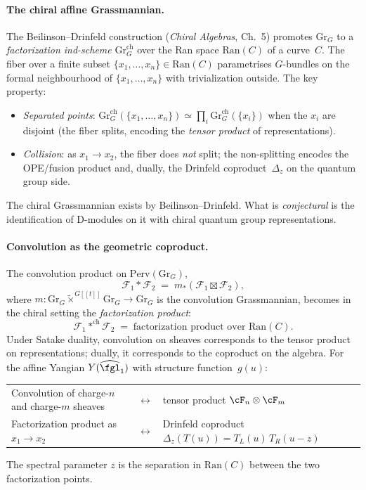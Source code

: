 \paragraph{The chiral affine Grassmannian.}
The Beilinson--Drinfeld construction (\emph{Chiral Algebras}, Ch.~5) promotes $\mathrm{Gr}_G$ to a \emph{factorization ind-scheme} $\mathrm{Gr}^{\mathrm{ch}}_G$ over the Ran space $\mathrm{Ran}(C)$ of a curve~$C$.
The fiber over a finite subset $\{x_1, \ldots, x_n\} \in \mathrm{Ran}(C)$ parametrises $G$-bundles on the formal neighbourhood of $\{x_1, \ldots, x_n\}$ with trivialization outside.
The key property:
\begin{itemize}
 \item \emph{Separated points}: $\mathrm{Gr}^{\mathrm{ch}}_G(\{x_1, \ldots, x_n\}) \simeq \prod_i \mathrm{Gr}^{\mathrm{ch}}_G(\{x_i\})$ when the $x_i$ are disjoint (the fiber splits, encoding the \emph{tensor product} of representations).
 \item \emph{Collision}: as $x_1 \to x_2$, the fiber does \emph{not} split; the non-splitting encodes the OPE/fusion product and, dually, the Drinfeld coproduct~$\Delta_z$ on the quantum group side.
\end{itemize}
The chiral Grassmannian exists by Beilinson--Drinfeld.
What is \emph{conjectural} is the identification of D-modules on it with chiral quantum group representations.

\paragraph{Convolution as the geometric coproduct.}
The convolution product on $\mathrm{Perv}(\mathrm{Gr}_G)$,
\[
 \mathcal{F}_1 * \mathcal{F}_2 \;=\; m_*(\mathcal{F}_1 \boxtimes \mathcal{F}_2),
\]
where $m\colon \mathrm{Gr}_G \tilde{\times}^{G[\![t]\!]} \mathrm{Gr}_G \to \mathrm{Gr}_G$ is the convolution Grassmannian, becomes in the chiral setting the \emph{factorization product}:
\[
 \mathcal{F}_1 *^{\mathrm{ch}} \mathcal{F}_2 \;=\; \text{factorization product over } \mathrm{Ran}(C).
\]
Under Satake duality, convolution on sheaves corresponds to the tensor product on representations; dually, it corresponds to the coproduct on the algebra.
For the affine Yangian $Y(\widehat{\fgl}_1)$ with structure function~$g(u)$:
\begin{center}
\begin{tabular}{lcl}
 Convolution of charge-$n$ and charge-$m$ sheaves & $\longleftrightarrow$ & tensor product $\cF_n \otimes \cF_m$ \\
 Factorization product as $x_1 \to x_2$ & $\longleftrightarrow$ & Drinfeld coproduct $\Delta_z(T(u)) = T_L(u)\,T_R(u - z)$
\end{tabular}
\end{center}
The spectral parameter $z$ is the separation in $\mathrm{Ran}(C)$ between the two factorization points.

